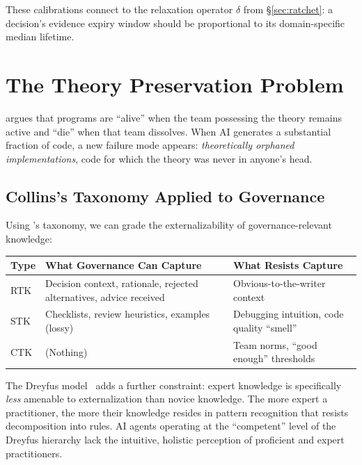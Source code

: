 \documentclass[11pt, a4paper, copyright]{googledeepmind}
\begin{document}
These calibrations connect to the relaxation operator $\delta$ from \S\ref{sec:ratchet}: a decision's evidence expiry window should be proportional to its domain-specific median lifetime.


\section{The Theory Preservation Problem}
\label{sec:theory}

\citet{naur1985} argues that programs are ``alive'' when the team possessing the theory remains active and ``die'' when that team dissolves. When AI generates a substantial fraction of code, a new failure mode appears: \emph{theoretically orphaned implementations}, code for which the theory was never in anyone's head.

\subsection{Collins's Taxonomy Applied to Governance}

Using \citet{collins2010}'s taxonomy, we can grade the externalizability of governance-relevant knowledge:

\begin{center}
\begin{tabular}{lp{5cm}p{5cm}}
\toprule
Type & What Governance Can Capture & What Resists Capture \\
\midrule
RTK & Decision context, rationale, rejected alternatives, advice received & Obvious-to-the-writer context \\
STK & Checklists, review heuristics, examples (lossy) & Debugging intuition, code quality ``smell'' \\
CTK & (Nothing) & Team norms, ``good enough'' thresholds \\
\bottomrule
\end{tabular}
\end{center}

The Dreyfus model~\citep{dreyfus1986} adds a further constraint: expert knowledge is specifically \emph{less} amenable to externalization than novice knowledge. The more expert a practitioner, the more their knowledge resides in pattern recognition that resists decomposition into rules. AI agents operating at the ``competent'' level of the Dreyfus hierarchy lack the intuitive, holistic perception of proficient and expert practitioners.
\end{document}
